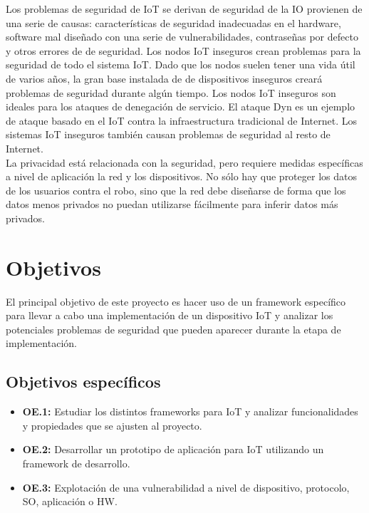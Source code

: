 {Los problemas de seguridad de IoT se derivan de seguridad de la IO provienen de una serie de causas: características de seguridad inadecuadas en el hardware, software mal diseñado con una serie de vulnerabilidades, contraseñas por defecto y otros errores de de seguridad. Los nodos IoT inseguros crean problemas para la seguridad de todo el sistema IoT. Dado que los nodos suelen tener una vida útil de varios años, la gran base instalada de de dispositivos inseguros creará problemas de seguridad durante algún tiempo. Los nodos IoT inseguros son ideales para los ataques de denegación de servicio. El ataque Dyn es un ejemplo de ataque basado en el IoT contra la infraestructura tradicional de Internet. Los sistemas IoT inseguros también causan problemas de seguridad al resto de Internet. \\

La privacidad está relacionada con la seguridad, pero requiere medidas específicas a nivel de aplicación la red y los dispositivos. No sólo hay que proteger los datos de los usuarios contra el robo, sino que la red debe diseñarse de forma que los datos menos privados no puedan utilizarse fácilmente para inferir datos más privados. \cite{serpanos2018internet} \\ 

\section{Objetivos} \label{sec:objetivos}

El principal objetivo de este proyecto es hacer uso de un framework específico para llevar a cabo una implementación de un dispositivo IoT y analizar los potenciales problemas de seguridad que pueden aparecer durante la etapa de implementación.

\subsection{Objetivos específicos}

\begin{itemize}
    \item \textbf{OE.1:} Estudiar los distintos frameworks para IoT y analizar funcionalidades y propiedades que se ajusten al proyecto.
    \item \textbf{OE.2:} Desarrollar un prototipo de aplicación para IoT utilizando un framework de desarrollo.
    \item \textbf{OE.3:} Explotación de una vulnerabilidad a nivel de dispositivo, protocolo, SO, aplicación o HW.
\end{itemize}

}